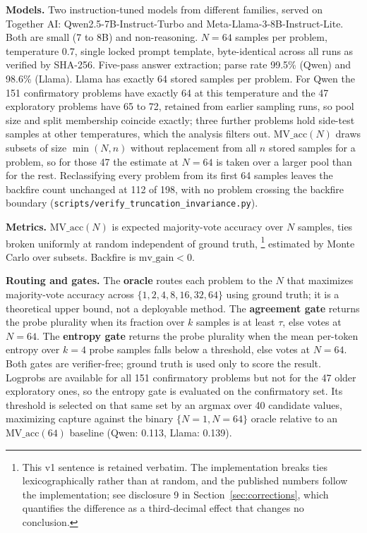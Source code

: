 \documentclass{article}
\begin{document}
\textbf{Models.} Two instruction-tuned models from different families, served
on Together AI: Qwen2.5-7B-Instruct-Turbo and Meta-Llama-3-8B-Instruct-Lite.
Both are small (7 to 8B) and non-reasoning. $N=64$ samples per problem,
temperature 0.7, single locked prompt template, byte-identical across all runs
as verified by SHA-256. Five-pass answer extraction; parse rate 99.5\% (Qwen)
and 98.6\% (Llama). Llama has exactly 64 stored samples per problem. For Qwen
the 151 confirmatory problems have exactly 64 at this temperature and the 47
exploratory problems have 65 to 72, retained from earlier sampling runs, so
pool size and split membership coincide exactly; three further problems hold
side-test samples at other temperatures, which the analysis filters out.
$\text{MV\_acc}(N)$ draws subsets of size $\min(N, n)$ without replacement from
all $n$ stored samples for a problem, so for those 47 the estimate at $N=64$ is
taken over a larger pool than for the rest. Reclassifying every problem from
its first 64 samples leaves the backfire count unchanged at 112 of 198, with no
problem crossing the backfire boundary
(\texttt{scripts/verify\_truncation\_invariance.py}).

\textbf{Metrics.} $\text{MV\_acc}(N)$ is expected majority-vote accuracy over
$N$ samples, ties broken uniformly at random independent of ground truth,%
\footnote{This v1 sentence is retained verbatim. The implementation breaks ties
lexicographically rather than at random, and the published numbers follow the
implementation; see disclosure 9 in Section~\ref{sec:corrections}, which
quantifies the difference as a third-decimal effect that changes no
conclusion.}
estimated by Monte Carlo over subsets. Backfire is $\text{mv\_gain} < 0$.

\textbf{Routing and gates.} The \textbf{oracle} routes each problem to the
$N$ that maximizes majority-vote accuracy across $\{1,2,4,8,16,32,64\}$ using
ground truth; it is a theoretical upper bound, not a deployable method. The
\textbf{agreement gate} returns the probe plurality when its fraction over $k$
samples is at least $\tau$, else votes at $N=64$. The \textbf{entropy gate}
returns the probe plurality when the mean per-token entropy over $k=4$ probe
samples falls below a threshold, else votes at $N=64$. Both gates are
verifier-free; ground truth is used only to score the result. Logprobs are available for all
151 confirmatory problems but not for the 47 older exploratory ones, so the
entropy gate is evaluated on the confirmatory set. Its threshold is selected
on that same set by an argmax over 40 candidate values, maximizing capture
against the binary $\{N=1, N=64\}$ oracle relative to an
$\text{MV\_acc}(64)$ baseline (Qwen: 0.113, Llama: 0.139).
\end{document}
